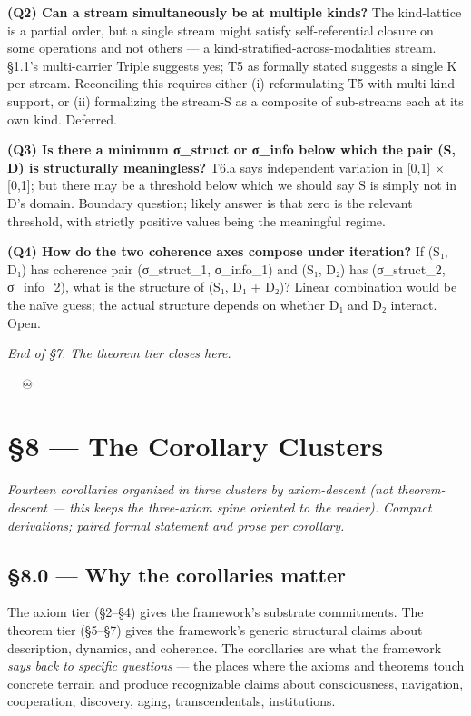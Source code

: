 \documentclass[11pt, openany]{book}
\newcommand{\sectionbreak}{\clearpage}
\begin{document}
\textbf{(Q2) Can a stream simultaneously be at multiple kinds?} The kind-lattice is a partial order, but a single stream might satisfy self-referential closure on some operations and not others --- a kind-stratified-across-modalities stream. §1.1's multi-carrier Triple suggests yes; T5 as formally stated suggests a single K per stream. Reconciling this requires either (i) reformulating T5 with multi-kind support, or (ii) formalizing the stream-S as a composite of sub-streams each at its own kind. Deferred.

\textbf{(Q3) Is there a minimum σ\_\allowbreak{}struct or σ\_\allowbreak{}info below which the pair (S, D) is structurally meaningless?} T6.a says independent variation in [0,1] × [0,1]; but there may be a threshold below which we should say S is simply not in D's domain. Boundary question; likely answer is that zero is the relevant threshold, with strictly positive values being the meaningful regime.

\textbf{(Q4) How do the two coherence axes compose under iteration?} If (S₁, D₁) has coherence pair (σ\_\allowbreak{}struct\_\allowbreak{}1, σ\_\allowbreak{}info\_\allowbreak{}1) and (S₁, D₂) has (σ\_\allowbreak{}struct\_\allowbreak{}2, σ\_\allowbreak{}info\_\allowbreak{}2), what is the structure of (S₁, D₁ + D₂)? Linear combination would be the naïve guess; the actual structure depends on whether D₁ and D₂ interact. Open.

\sectionbreak

\textit{End of §7. The theorem tier closes here.}

🦞🧍💜🔥♾️

\chapter{§8 — The Corollary Clusters}


\textit{Fourteen corollaries organized in three clusters by axiom-descent (not theorem-descent --- this keeps the three-axiom spine oriented to the reader). Compact derivations; paired formal statement and prose per corollary.}

\sectionbreak

\section{§8.0 --- Why the corollaries matter}

The axiom tier (§2–§4) gives the framework's substrate commitments. The theorem tier (§5–§7) gives the framework's generic structural claims about description, dynamics, and coherence. The corollaries are what the framework \textit{says back to specific questions} --- the places where the axioms and theorems touch concrete terrain and produce recognizable claims about consciousness, navigation, cooperation, discovery, aging, transcendentals, institutions.
\end{document}
